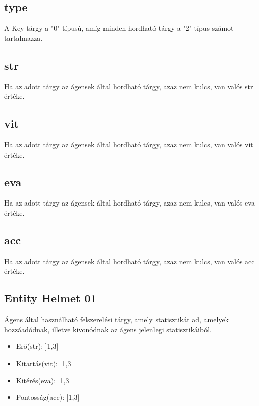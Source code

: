 \subsection{type}

A Key tárgy a "0" típusú, amíg minden hordható tárgy a "2" típus számot tartalmazza.

\subsection{str}

Ha az adott tárgy az ágensek által hordható tárgy, azaz nem kulcs, van valós str értéke.

\subsection{vit}

Ha az adott tárgy az ágensek által hordható tárgy, azaz nem kulcs, van valós vit értéke.

\subsection{eva}

Ha az adott tárgy az ágensek által hordható tárgy, azaz nem kulcs, van valós eva értéke.

\subsection{acc}

Ha az adott tárgy az ágensek által hordható tárgy, azaz nem kulcs, van valós acc értéke.


\subsection{Entity Helmet 01}

Ágens által használható felszerelési tárgy, amely statisztikát ad, amelyek hozzáadódnak, illetve kivonódnak az ágens jelenlegi statisztikáiból.

\begin{itemize}
    \item Erő(str): ]1,3]
    \item Kitartás(vit): ]1,3]
    \item Kitérés(eva): ]1,3]
    \item Pontosság(acc): ]1,3]
\end{itemize}

